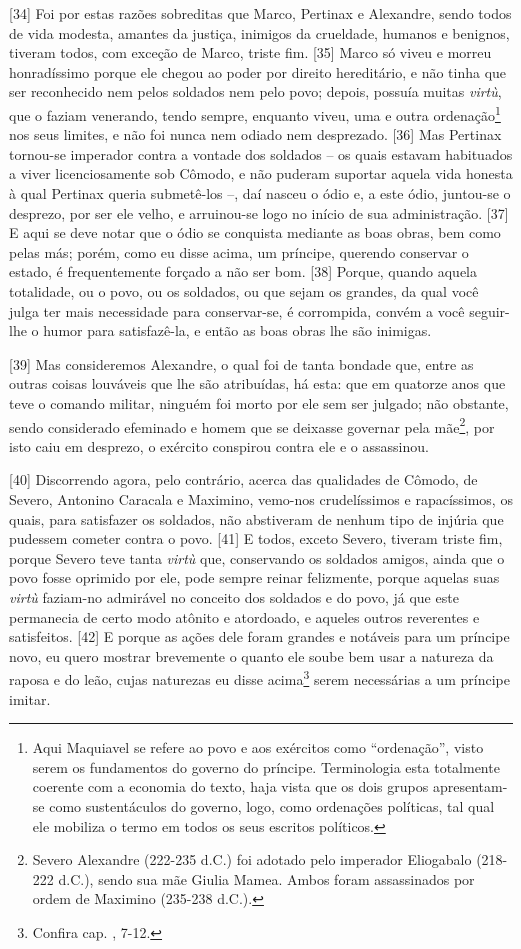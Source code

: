 {[}34{]} Foi por estas razões sobreditas que Marco, Pertinax e
Alexandre, sendo todos de vida modesta, amantes da justiça, inimigos da
crueldade, humanos e benignos, tiveram todos, com exceção de Marco,
triste fim. {[}35{]} Marco só viveu e morreu honradíssimo porque ele
chegou ao poder por direito hereditário, e não tinha que ser reconhecido
nem pelos soldados nem pelo povo; depois, possuía muitas \emph{virtù},
que o faziam venerando, tendo sempre, enquanto viveu, uma e outra
ordenação\footnote{Aqui Maquiavel se refere ao povo e aos exércitos como
  ``ordenação'', visto serem os fundamentos do governo do príncipe.
  Terminologia esta totalmente coerente com a economia do texto, haja
  vista que os dois grupos apresentam-se como sustentáculos do governo,
  logo, como ordenações políticas, tal qual ele mobiliza o termo em
  todos os seus escritos políticos.} nos seus limites, e não foi nunca
nem odiado nem desprezado. {[}36{]} Mas Pertinax tornou-se imperador
contra a vontade dos soldados -- os quais estavam habituados a viver
licenciosamente sob Cômodo, e não puderam suportar aquela vida honesta à
qual Pertinax queria submetê-los --, daí nasceu o ódio e, a este ódio,
juntou-se o desprezo, por ser ele velho, e arruinou-se logo no início de
sua administração. {[}37{]} E aqui se deve notar que o ódio se conquista
mediante as boas obras, bem como pelas más; porém, como eu disse acima,
um príncipe, querendo conservar o estado, é frequentemente forçado a não
ser bom. {[}38{]} Porque, quando aquela totalidade, ou o povo, ou os
soldados, ou que sejam os grandes, da qual você julga ter mais
necessidade para conservar-se, é corrompida, convém a você seguir-lhe o
humor para satisfazê-la, e então as boas obras lhe são inimigas.

{[}39{]} Mas consideremos Alexandre, o qual foi de tanta bondade que,
entre as outras coisas louváveis que lhe são atribuídas, há esta: que em
quatorze anos que teve o comando militar, ninguém foi morto por ele sem
ser julgado; não obstante, sendo considerado efeminado e homem que se
deixasse governar pela mãe\footnote{Severo Alexandre (222-235 d.C.) foi
  adotado pelo imperador Eliogabalo (218-222 d.C.), sendo sua mãe Giulia
  Mamea. Ambos foram assassinados por ordem de Maximino (235-238 d.C.).},
por isto caiu em desprezo, o exército conspirou contra ele e o
assassinou.

{[}40{]} Discorrendo agora, pelo contrário, acerca das qualidades de
Cômodo, de Severo, Antonino Caracala e Maximino, vemo-nos crudelíssimos
e rapacíssimos, os quais, para satisfazer os soldados, não abstiveram de
nenhum tipo de injúria que pudessem cometer contra o povo. {[}41{]} E
todos, exceto Severo, tiveram triste fim, porque Severo teve tanta
\emph{virtù} que, conservando os soldados amigos, ainda que o povo fosse
oprimido por ele, pode sempre reinar felizmente, porque aquelas suas
\emph{virtù} faziam-no admirável no conceito dos soldados e do povo, já
que este permanecia de certo modo atônito e atordoado, e aqueles outros
reverentes e satisfeitos. {[}42{]} E porque as ações dele foram grandes
e notáveis para um príncipe novo, eu quero mostrar brevemente o quanto
ele soube bem usar a natureza da raposa e do leão, cujas naturezas eu
disse acima\footnote{Confira cap. , 7-12.} serem necessárias a um
príncipe imitar.


